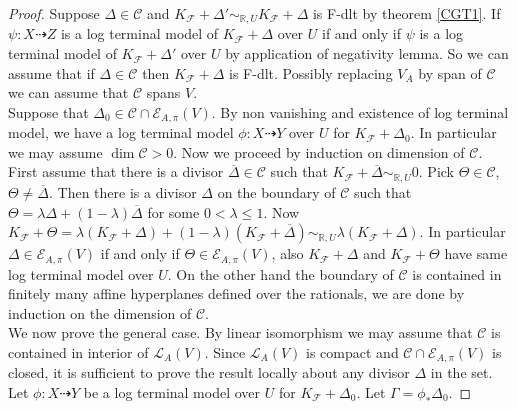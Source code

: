 \documentclass[12pt]{amsart}%
\theoremstyle{plain}
\theoremstyle{remark}
\theoremstyle{definition}
\newcommand{\<}{\leq}
\newcommand{\mbR}{\mathbb{R}}
\def\dim{\operatorname{dim}}
\theoremstyle{definition}
\theoremstyle{definition}
\numberwithin{equation}{section}
\theoremstyle{remark}
\begin{document}
\begin{proof}
Suppose $\Delta\in \mathcal{C}$ and $K_{\mathcal{F}}+\Delta'\sim_{\mbR,U}K_{\mathcal{F}}+\Delta$ is F-dlt by theorem \ref{CGT1}. If $\psi:X\dashrightarrow Z$ is a log terminal model of $K_{\mathcal{F}}+\Delta$ over $U$ if and only if $\psi$ is a log terminal model of $K_{\mathcal{F}}+\Delta'$ over $U$ by application of negativity lemma. So we can assume that if $\Delta\in \mathcal{C}$ then $K_{\mathcal{F}}+\Delta$ is F-dlt. Possibly replacing $V_A$ by span of $\mathcal{C}$ we can assume that $\mathcal{C}$ spans $V$.\\
Suppose that $\Delta_0\in \mathcal{C}\cap\mathcal{E}_{A,\pi}(V)$. By non vanishing and existence of log terminal model, we have a log terminal model $\phi:X\dashrightarrow Y$ over $U$ for $K_{\mathcal{F}}+\Delta_0$. In particular we may assume $\dim \mathcal{C}>0$. Now we proceed by induction on dimension of $\mathcal{C}$.\\
First assume that there is a divisor $\overline{\Delta}\in \mathcal{C}$ such that $K_{\mathcal{F}}+\overline{\Delta}\sim_{\mbR,U}0$. Pick $\Theta\in\mathcal{C}$, $\Theta\neq \overline{\Delta}$. Then there is a divisor $\Delta$ on the boundary of $\mathcal{C}$ such that $\Theta=\lambda\Delta+(1-\lambda)\overline{\Delta}$ for some $0<\lambda\leqslant 1$. Now $K_{\mathcal{F}}+\Theta=\lambda(K_{\mathcal{F}}+\Delta)+(1-\lambda)(K_{\mathcal{F}}+\overline{\Delta})\sim_{\mbR,U}\lambda (K_{\mathcal{F}}+\Delta)$. In particular $\Delta\in\mathcal{E}_{A,\pi}(V)$ if and only if $\Theta\in\mathcal{E}_{A,\pi}(V)$, also $K_{\mathcal{F}}+\Delta$ and $K_{\mathcal{F}}+\Theta$ have same log terminal model over $U$. On the other hand the boundary of $\mathcal{C}$ is contained in finitely many affine hyperplanes defined over the rationals, we are done by induction on the dimension of $\mathcal{C}$.\\
We now prove the general case. By linear isomorphism we may assume that $\mathcal{C}$ is contained in interior of $\mathcal{L}_A(V)$. Since $\mathcal{L}_A(V)$ is compact and $\mathcal{C}\cap \mathcal{E}_{A,\pi}(V)$ is closed, it is sufficient to prove the result locally about any divisor $\Delta$ in the set. Let $\phi:X\dashrightarrow Y$ be a log terminal model over $U$ for $K_{\mathcal{F}}+\Delta_0$. Let $\Gamma=\phi_*\Delta_0$.

\end{proof}
\end{document}
